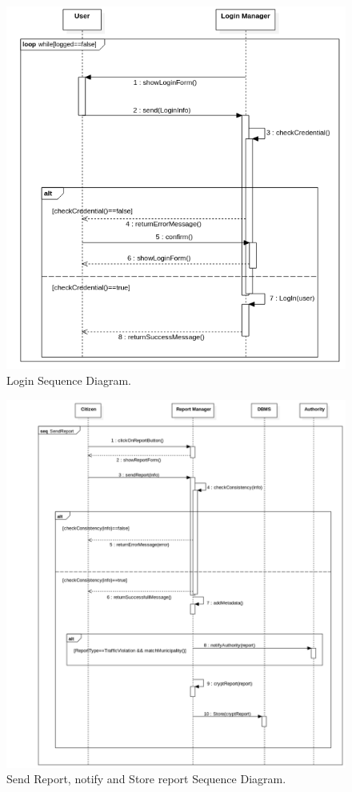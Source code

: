 \documentclass{report}
\begin{document}
\newpage
\begin{figure}[ht!]
\begin{center}
\includegraphics[width=\textwidth]{./img/LoginSD.png}
\end{center}
\caption{Login Sequence Diagram.}
\label{fig:SequenceDiagram2}
\end{figure}
\newpage
\begin{figure}[ht!]
\begin{center}
\includegraphics[width=\textwidth]{./img/SendReportSD.png}
\end{center}
\caption{Send Report, notify and Store report Sequence Diagram.}
\label{fig:SequenceDiagram3}
\end{figure}
\end{document}
